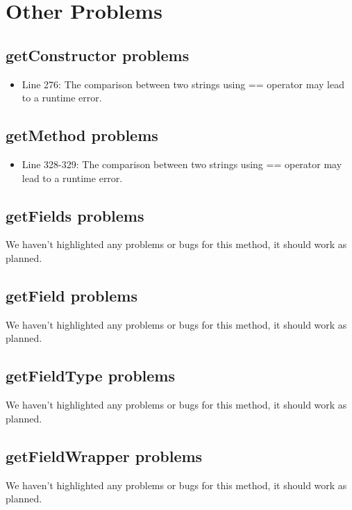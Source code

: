 \section{Other Problems}

\subsection{getConstructor problems}
\begin{itemize}
	\item Line 276: The comparison between two strings using == operator may lead to a runtime error.
\end{itemize}

\subsection{getMethod problems}
\begin{itemize}
	\item Line 328-329: The comparison between two strings using == operator may lead to a runtime error.
\end{itemize}

\subsection{getFields problems}
We haven't highlighted any problems or bugs for this method, it should work as planned.

\subsection{getField problems}
We haven't highlighted any problems or bugs for this method, it should work as planned.

\subsection{getFieldType problems}
We haven't highlighted any problems or bugs for this method, it should work as planned.

\subsection{getFieldWrapper problems}
We haven't highlighted any problems or bugs for this method, it should work as planned.